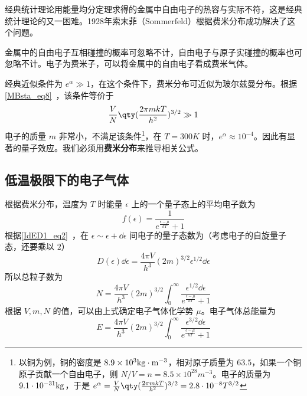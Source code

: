 

经典统计理论用能量均分定理求得的金属中自由电子的热容与实际不符，这是经典统计理论的又一困难。1928年索末菲（Sommerfeld）根据费米分布成功解决了这个问题。

金属中的自由电子互相碰撞的概率可忽略不计，自由电子与原子实碰撞的概率也可忽略不计。电子为费米子，可以将金属中的自由电子看成费米气体。

经典近似条件为 $e^{\alpha}\gg 1$，在这个条件下，费米分布可近似为玻尔兹曼分布。根据\autoref{MBsta_eq8}~，该条件等价于
\begin{equation}
\frac{V}{N}\qty(\frac{2\pi mkT}{h^2})^{3/2}\gg 1
\end{equation}
电子的质量 $m$ 非常小，不满足该条件\footnote{以铜为例，铜的密度是 $8.9\times 10^3 \rm{kg\cdot m^{-3}}$，相对原子质量为 $63.5$，如果一个铜原子贡献一个自由电子，则 $N/V=n=8.5\times 10^{28} m^{-3}$。电子的质量为 $9.1\cdot 10^{-31} \rm{kg}$，于是 $e^\alpha=\frac{V}{N}\qty(\frac{2\pi m kT}{h^2})^{3/2}=2.8\cdot 10^{-8}T^{3/2}$}，在 $T=300K$ 时，$e^\alpha\approx 10^{-4}$。因此有显著的量子效应。我们必须用\textbf{费米分布}来推导相关公式。

\subsection{低温极限下的电子气体}
根据费米分布，温度为 $T$ 时能量 $\epsilon$ 上的一个量子态上的平均电子数为
\begin{equation}\label{mfcgas_eq4}
f(\epsilon)=\frac{1}{e^{\frac{\epsilon-\mu}{kT}}+1}
\end{equation}
根据\autoref{IdED1_eq2}~，在 $\epsilon\sim\epsilon+\dd \epsilon$ 间电子的量子态数为（考虑电子的自旋量子态，还要乘以 $2$）
\begin{equation}
D(\epsilon) \dd \epsilon = \frac{4\pi V}{h^3}(2m)^{3/2}\epsilon^{1/2}\dd \epsilon
\end{equation}
所以总粒子数为
\begin{equation}\label{mfcgas_eq1}
N=\frac{4\pi V}{h^3}(2m)^{3/2}\int_0^\infty \frac{\epsilon^{1/2}\dd \epsilon}{e^{\frac{\epsilon-\mu}{kT}}+1}
\end{equation}
根据 $V,m,N$ 的值，可以由上式确定电子气体化学势 $\mu$。电子气体总能量为
\begin{equation}\label{mfcgas_eq2}
E=\frac{4\pi V}{h^3}(2m)^{3/2}\int_0^\infty \frac{\epsilon^{3/2}\dd \epsilon}{e^{\frac{\epsilon-\mu}{kT}}+1}
\end{equation}

